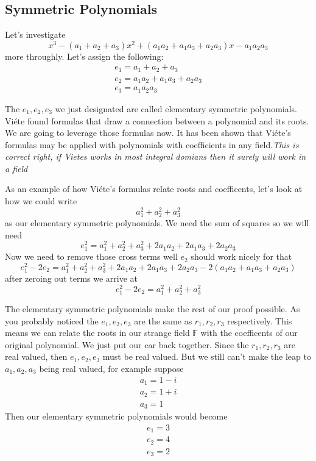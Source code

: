 \documentclass[12pt]{article}
\begin{document}
\subsection*{Symmetric Polynomials}
Let's investigate $$x^3 -(a_1+a_2+a_3)x^2+(a_1a_2 +a_1a_3 +a_2a_3)x -a_1a_2a_3$$ more throughly.  Let's assign the following:
\begin{align*}
e_1 = a_1 + a_2 +a_3 \\
e_2 = a_1a_2 +a_1a_3 +a_2a_3 \\
e_3 = a_1a_2a_3
\end{align*}

The $e_1, e_2, e_3$ we just designated are called elementary symmetric polynomials.  Vi\'ete found formulas that draw a connection between a polynomial and its roots.  We are going to leverage those formulas now.  It has been shown that Vi\'ete's formulas may be applied with polynomials with coefficients in any field.\emph{This is correct right, if Vietes works in most integral domians then it surely will work in a field}


As an example of how Vi\'ete's formulas relate roots and coefficents, let's look at how we could write
$$ a_1^2 + a_2^2 + a_3^2$$
as our elementary symmetric polynomials.  We need the sum of squares so we will need $$e_1^2 = a_1^2 + a_2^2 + a_3^2 + 2a_1a_2 + 2a_1a_3 + 2a_2a_3$$
Now we need to remove those cross terms well $e_2$ should work nicely for that
$$e_1^2 - 2e_2 = a_1^2 + a_2^2 + a_3^2 + 2a_1a_2 + 2a_1a_3 + 2a_2a_3 - 2(a_1a_2 +a_1a_3 +a_2a_3)$$
after zeroing out terms we arrive at
$$e_1^2 - 2e_2 = a_1^2 + a_2^2 + a_3^2$$


The elementary symmetric polynomials make the rest of our proof possible.  As you probably noticed the $e_1, e_2, e_3$ are the same as $r_1, r_2, r_3$ respectively.  This means we can relate the roots in our strange field $\mathbb{F}$ with the coefficents of our original polynomial.  We just put our car back together.  Since the $r_1, r_2, r_3$ are real valued, then $e_1, e_2, e_3$ must be real valued.  But we still can't make the leap to $a_1, a_2, a_3$ being real valued, for example suppose 
\begin{align*}
a_1 = 1-i \\
a_2 = 1+i \\
a_3 = 1
\end{align*}
Then our elementary symmetric polynomials would become
\begin{align*}
e_1 = 3 \\
e_2 = 4 \\
e_3 = 2
\end{align*}
\end{document}
